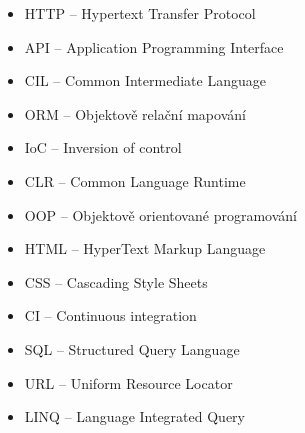 \documentclass[12pt,a4paper]{report}
\begin{document}



\tableofcontents









\listoffigures


\begin{itemize}
	\item HTTP -- Hypertext Transfer Protocol
	\item API -- Application Programming Interface
	\item CIL -- Common Intermediate Language
	\item ORM -- Objektově relační mapování
	\item IoC -- Inversion of control
	\item CLR -- Common Language Runtime
	\item OOP -- Objektově orientované programování
	\item HTML -- HyperText Markup Language 
	\item CSS -- Cascading Style Sheets
	\item CI -- Continuous integration
	\item SQL -- Structured Query Language
	\item URL -- Uniform Resource Locator
	\item LINQ -- Language Integrated Query
	
\end{itemize}

\appendix
\end{document}
